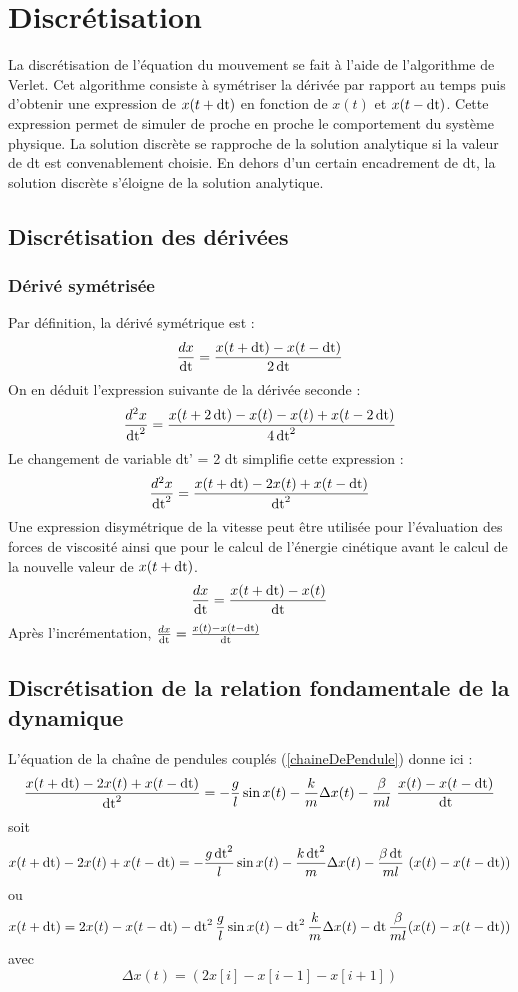 
\section{Discrétisation}
%
La discrétisation de l'équation du mouvement se fait à l'aide de l'algorithme de Verlet. Cet algorithme consiste à symétriser la dérivée par rapport au temps puis d'obtenir une expression de $x(t+\operatorname{dt})$ en fonction de $x(t)$ et $x(t-\operatorname{dt})$. Cette expression permet de simuler de proche en proche le comportement du système physique. La solution discrète se rapproche de la solution analytique si la valeur de dt est convenablement choisie. En dehors d'un certain encadrement de dt, la solution discrète s'éloigne de la solution analytique.
%
\subsection{Discrétisation des dérivées}
%
\subsubsection{Dérivé symétrisée}
Par définition, la dérivé symétrique est :
\[
\frac{dx}{\operatorname{dt}}=\frac{x(t+\operatorname{dt})-x(t-\operatorname{dt})}{2\operatorname{dt}}
\]
On en déduit l'expression suivante de la dérivée seconde :
\[
\frac{d^2x}{\operatorname{dt}^2}=\frac{x(t+2\operatorname{dt})-x(t)-x(t)+x(t-2\operatorname{dt})}{4\operatorname{dt}^2}
\]
Le changement de variable dt' = 2 dt simplifie cette expression :
\[
\frac{d^2x}{\operatorname{dt}^2}=\frac{x(t+\operatorname{dt})-2x(t)+x(t-\operatorname{dt})}{\operatorname{dt}^2}
\]
Une expression disymétrique de la vitesse peut être utilisée pour l'évaluation des forces de viscosité ainsi que pour le calcul de l'énergie cinétique avant le calcul de la nouvelle valeur de $x(t+\operatorname{dt})$.
\[
\frac{dx}{\operatorname{dt}}=\frac{x(t+\operatorname{dt})-x(t)}{\operatorname{dt}}
\]
{\footnotesize Après l'incrémentation, } $\frac{dx}{\operatorname{dt}}=\frac{x(t)-x(t-\operatorname{dt})}{\operatorname{dt}}$
%
\subsection{Discrétisation de la relation fondamentale de la dynamique}
%
L'équation de la chaîne de pendules couplés (\ref{chaineDePendule}) donne ici :
%
\[
\frac{x(t+\operatorname{dt}) - 2x(t) + x(t-\operatorname{dt})}{\operatorname{dt}^2} = - \frac{g}{l} \sin{x(t)}  -  \frac{k}{m} \Delta x(t)  -  \frac{\beta}{ml}\ \frac{x(t) - x(t-\operatorname{dt})}{\operatorname{dt}}
\]
soit
\[
x(t+\operatorname{dt}) - 2x(t) + x(t-\operatorname{dt}) = - \frac{g\operatorname{dt}^2}{l} \sin{x(t)}  -  \frac{k\operatorname{dt}^2}{m} \Delta x(t)  -  \frac{\beta \operatorname{dt}}{ml}\ (x(t) - x(t-\operatorname{dt}))
\]
ou
\[
x(t+\operatorname{dt}) = 2x(t) - x(t-\operatorname{dt}) - \operatorname{dt}^2\frac{g}{l}\sin{x(t)}-\operatorname{dt}^2\frac{k}{m} \Delta x(t) - \operatorname{dt}\frac{\beta}{ml}(x(t)-x(t-\operatorname{dt}))
\]
avec
\[
\Delta x(t) = (2x[i]-x[i-1]-x[i+1])
\]

